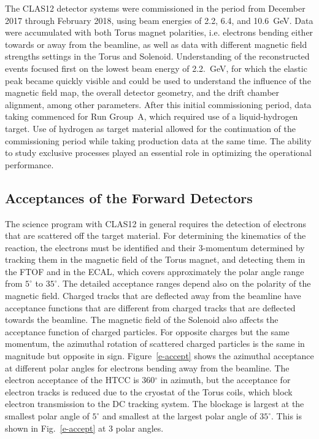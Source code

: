 \documentclass[final,3p,twocolumn]{elsarticle}
\begin{document}
The CLAS12 detector systems were commissioned in the period from December 2017 through February 2018, using
beam energies of 2.2, 6.4, and 10.6~GeV. Data were accumulated with both Torus magnet polarities, i.e. electrons
bending either towards or away from the beamline, as well as data with different magnetic field strengths settings
in the Torus and Solenoid. Understanding of the reconstructed events focused first on the lowest beam energy of
2.2.~GeV, for which the elastic peak became quickly visible and could be used to understand the influence of the
magnetic field map, the overall detector geometry, and the drift chamber alignment, among other parameters. After
this initial commissioning period, data taking commenced for Run Group~A, which required use of a liquid-hydrogen
target. Use of hydrogen as target material allowed for the continuation of the commissioning period while taking
production data at the same time. The ability to study exclusive processes played an essential role in optimizing the
operational performance. 

\subsection{Acceptances of the Forward Detectors} 

The science program with CLAS12 in general requires the detection of electrons that are scattered off the target
material. For determining the kinematics of the reaction, the electrons must be identified and their 3-momentum
determined by tracking them in the magnetic field of the Torus magnet, and detecting them in the FTOF and in the
ECAL, which covers approximately the polar angle range from $5^\circ$ to $35^\circ$. The detailed acceptance
ranges depend also on the polarity of the magnetic field. Charged tracks that are deflected away from the beamline
have acceptance functions that are different from charged tracks that are deflected towards the beamline. The
magnetic field of the Solenoid also affects the acceptance function of charged particles. For opposite charges but
the same momentum, the azimuthal rotation of scattered charged particles is the same in magnitude but opposite in
sign. Figure~\ref{e-accept} shows the azimuthal acceptance at different polar angles for electrons bending away from
the beamline. The electron acceptance of the HTCC is 360$^\circ$ in azimuth, but the acceptance for electron tracks is
reduced due to the cryostat of the Torus coils, which block electron transmission to the DC tracking system. The
blockage is largest at the smallest polar angle of $5^\circ$ and smallest at the largest polar angle of  $35^\circ$. This
is shown in Fig.~\ref{e-accept} at 3 polar angles.  
\end{document}
